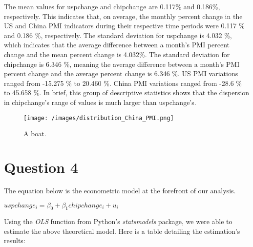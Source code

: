 \documentclass{article}
\begin{document}
The mean values for uspchange and chipchange are 0.117\% and 0.186\%, respectively. This indicates that, on average, the monthly percent change in the US and China PMI indicators during their respective time periods were 0.117 \% and 0.186 \%, respectively. The standard deviation for uspchange is 4.032 \%, which indicates that the average difference between a month’s PMI percent change and the mean percent change is 4.032\%. The standard deviation for chipchange is 6.346 \%, meaning the average difference between a month’s PMI percent change and the average percent change is 6.346 \%. US PMI variations ranged from -15.275 \% to 20.460 \%. China PMI variations ranged from -28.6 \% to 45.658 \%. In brief, this group of descriptive statistics shows that the dispersion in chipchange’s range of values is much larger than uspchange’s. 

\begin{table}
\begin{figure}
  \texttt{[image: /images/distribution\_China\_PMI.png]}
  \caption{A boat.}
  \label{fig:boat1}
\end{figure}
\end{table}







\section{Question 4}

The equation below is the econometric model at the forefront of our analysis.

\begin{center}
$uspchange_i = \beta_0 + \beta_1 chipchange_i + u_i $\end{center}
Using the \emph{OLS} function from Python's \emph{statsmodels} package, we were able to estimate the above theoretical model. Here is a table detailing the estimation's results:
\end{document}
